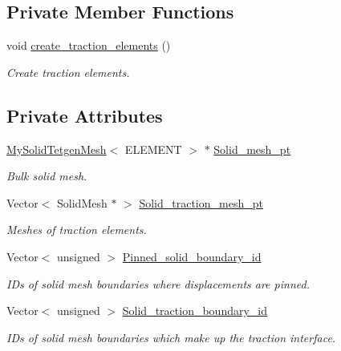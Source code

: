 \subsection*{Private Member Functions}
\begin{DoxyCompactItemize}
\item 
void \hyperlink{classUnstructuredSolidProblem_a9137960284200ed998989f785965f902}{create\+\_\+traction\+\_\+elements} ()
\begin{DoxyCompactList}\small\item\em Create traction elements. \end{DoxyCompactList}\end{DoxyCompactItemize}
\subsection*{Private Attributes}
\begin{DoxyCompactItemize}
\item 
\hyperlink{classMySolidTetgenMesh}{My\+Solid\+Tetgen\+Mesh}$<$ E\+L\+E\+M\+E\+NT $>$ $\ast$ \hyperlink{classUnstructuredSolidProblem_ad6a8cbe2c2f3596385e1a2484bfb68f7}{Solid\+\_\+mesh\+\_\+pt}
\begin{DoxyCompactList}\small\item\em Bulk solid mesh. \end{DoxyCompactList}\item 
Vector$<$ Solid\+Mesh $\ast$ $>$ \hyperlink{classUnstructuredSolidProblem_a32e691a698667053003e21333fc65057}{Solid\+\_\+traction\+\_\+mesh\+\_\+pt}
\begin{DoxyCompactList}\small\item\em Meshes of traction elements. \end{DoxyCompactList}\item 
Vector$<$ unsigned $>$ \hyperlink{classUnstructuredSolidProblem_a62ea7d593eaac6a3a0f0455c4a3fd805}{Pinned\+\_\+solid\+\_\+boundary\+\_\+id}
\begin{DoxyCompactList}\small\item\em I\+Ds of solid mesh boundaries where displacements are pinned. \end{DoxyCompactList}\item 
Vector$<$ unsigned $>$ \hyperlink{classUnstructuredSolidProblem_a4cf906bac719c9a942c04bda2798080f}{Solid\+\_\+traction\+\_\+boundary\+\_\+id}
\begin{DoxyCompactList}\small\item\em I\+Ds of solid mesh boundaries which make up the traction interface. \end{DoxyCompactList}\end{DoxyCompactItemize}


